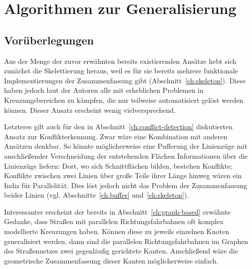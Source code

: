 \documentclass[../main/thesis.tex]{subfiles}
\begin{document}
\chapter{Algorithmen zur Generalisierung}
\label{ch:algorithm}

\section{Vorüberlegungen}



Aus der Menge der zuvor erwähnten bereits existierenden Ansätze hebt sich zunächst die Skelettierung heraus, weil es für sie bereits mehrere funktionale Implementierungen der Zusammenfassung gibt (Abschnitt~\ref{ch:skeleton}).
Diese haben jedoch laut der Autoren alle mit erheblichen Problemen in Kreuzungsbereichen zu kämpfen, die nur teilweise automatisiert gelöst werden können.
Dieser Ansatz erscheint wenig vielversprechend.

Letzteres gilt auch für den in Abschnitt~\ref{ch:conflict-detection} diskutierten Ansatz zur Konflikterkennung.
Zwar wäre eine Kombination mit anderen Ansätzen denkbar.
So könnte möglicherweise eine Pufferung der Linienzüge mit anschließender Verschneidung der entstehenden Flächen Informationen über die Linienzüge liefern:
Dort, wo sich Schnittflächen bilden, bestehen Konflikte;
Konflikte zwischen zwei Linien über große Teile ihrer Länge hinweg wären ein Indiz für Parallelität.
Dies löst jedoch nicht das Problem der Zusammenfassung beider Linien (vgl. Abschnitte~\ref{ch:buffer} und~\ref{ch:skeleton}).

Interessanter erscheint der bereits in Abschnitt~\ref{ch:graph-based} erwähnte Gedanke, dass Straßen mit parallelen Richtungsfahrbahnen oft komplex modellierte Kreuzungen haben.
Können diese zu jeweils einzelnen Knoten generalisiert werden, dann sind die parallelen Richtungsfahrbahnen im Graphen des Straßennetzes zwei gegenläufig gerichtete Kanten.
Anschließend wäre die geometrische Zusammenfassung dieser Kanten möglicherweise einfach.
\end{document}
